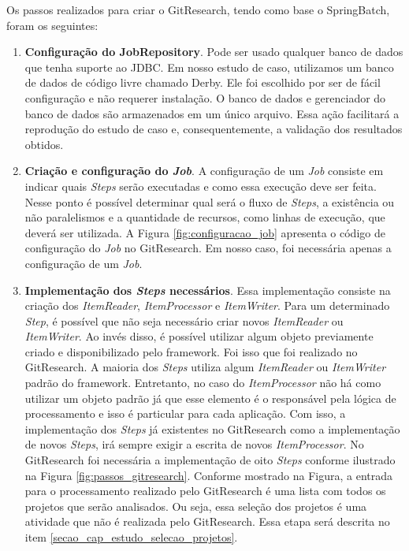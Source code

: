 Os passos realizados para criar o GitResearch, tendo como base o SpringBatch, foram os seguintes:


\begin{enumerate}
\item \textbf{Configuração do JobRepository}. Pode ser usado qualquer banco de dados que tenha suporte ao JDBC\cite{reese2000database}. Em nosso estudo de caso, utilizamos um banco de dados de código livre chamado Derby\cite{mei2010research}.  Ele foi escolhido por ser de fácil configuração e não requerer instalação. O banco de dados e gerenciador do banco de dados são armazenados em um único arquivo. Essa ação facilitará a reprodução do estudo de caso e, consequentemente, a validação dos resultados obtidos.
\item \textbf{Criação e configuração do \textit{Job}}. A configuração de um \textit{Job} consiste em indicar quais \textit{Steps} serão executadas e como essa execução deve ser feita. Nesse ponto é possível determinar qual será o fluxo de \textit{Steps}, a existência ou não paralelismos  e a quantidade de recursos, como linhas de execução, que deverá ser utilizada. A Figura \ref{fig:configuracao_job} apresenta o código de configuração do \textit{Job} no GitResearch. Em nosso caso, foi necessária apenas a configuração de um \textit{Job}.
\item \textbf{Implementação  dos  \textit{Steps} necessários}. Essa implementação consiste na criação dos \textit{ItemReader}, \textit{ItemProcessor} e \textit{ItemWriter}. Para um determinado \textit{Step}, é possível que não seja necessário criar novos \textit{ItemReader} ou \textit{ItemWriter}. Ao invés disso, é possível utilizar algum objeto previamente criado e disponibilizado pelo framework. Foi isso que foi realizado no GitResearch. A maioria dos \textit{Steps} utiliza algum \textit{ItemReader} ou \textit{ItemWriter} padrão do framework. Entretanto, no caso do \textit{ItemProcessor} não há como utilizar um objeto padrão já que esse elemento é o responsável pela lógica de processamento e isso é particular para cada aplicação. Com isso, a implementação dos \textit{Steps} já existentes no GitResearch como a implementação de novos \textit{Steps}, irá sempre exigir a escrita de novos \textit{ItemProcessor}. No GitResearch foi necessária a implementação de oito \textit{Steps} conforme ilustrado na Figura \ref{fig:passos_gitresearch}.  Conforme mostrado na Figura, a entrada para o processamento realizado pelo GitResearch é uma lista com todos os projetos que serão analisados. Ou seja, essa seleção dos projetos é uma atividade que não é realizada pelo GitResearch. Essa etapa será descrita no item \ref{secao_cap_estudo_selecao_projetos}.
\end{enumerate}



